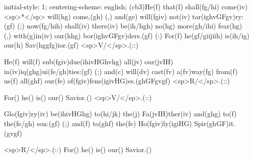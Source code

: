 initial-style: 1;
centering-scheme: english;
(cb3)He(f) that(f) shall(fg/hi) come(iv) <sp>*</sp> will(hg) come,(gh) (,) and(ge) will(fgiv) not(iv) tar(ighvGFgv)ry:(gf) (;) now(fg/hih) shall(iv) there(iv) be(ih/hgh) no(hg) more(gh/ihi) fear(hg) (,) with(g)in(iv) our(hhg) bor(ighvGFgv)ders.(gf) (:) For(f) he(gf/giijiih) is(ih/ig) our(h) Sav(hggfg)ior.(gf) <sp>V/</sp>.(::)

He(f) will(f) sub(fgiv)due(ihivHGhvhg) all(jv) our(jvIH) in(iv)iq(ghg)ui(fe/gh)ties:(gf) (;) and(c) will(dv) cast(fv) a(fv)way(fg) from(f) us(f) all(ghf) our(fe) of(fgiv)fens(igivHG)es.(ghGFgvgf) <sp>R/</sp>.(::)

For() he() is() our() Savior.() <sp>V/</sp>.(::)

Glo(fgiv)ry(iv) be(ihivHGhg) to(hi/jk) the(j) Fa(jvIH)ther(iv) and(ghg) to(f) the(fe/gh) son:(gf) (;) and(f) to(ghf) the(fe) Ho(fgiv)ly(igiHG) Spir(ghGF)it.(gvgf)

<sp>R/</sp>.(::) For() he() is() our() Savior.()
